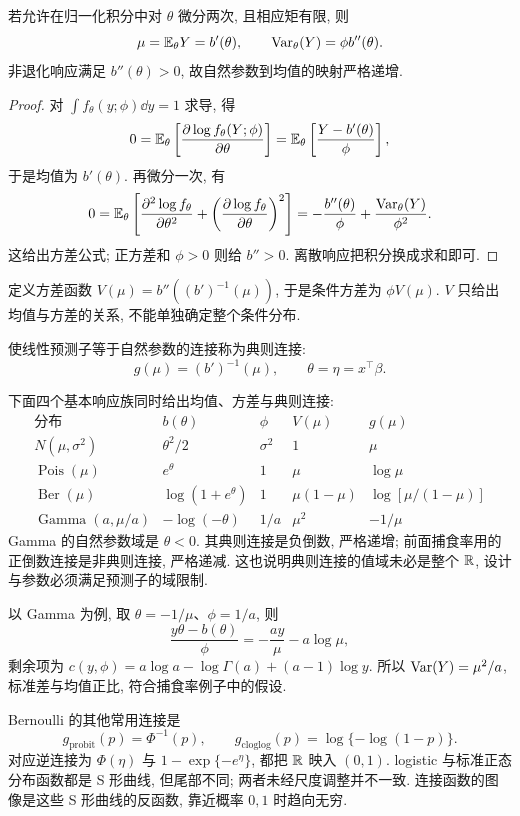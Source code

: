 \begin{theorem}[均值与方差公式]
若允许在归一化积分中对 $\theta$ 微分两次, 且相应矩有限, 则
\[
 \mu=\mathbb E_\theta Y=b'(\theta),\qquad
 \operatorname{Var}_\theta(Y)=\phi b''(\theta).
\]
非退化响应满足 $b''(\theta)>0$, 故自然参数到均值的映射严格递增. 
\end{theorem}
\begin{proof}
对 $\int f_\theta(y;\phi)\dd y=1$ 求导, 得
\[
 0=\mathbb E_\theta\left[\frac{\partial\log f_\theta(Y;\phi)}{\partial\theta}\right]
  =\mathbb E_\theta\left[\frac{Y-b'(\theta)}\phi\right],
\]
于是均值为 $b'(\theta)$. 再微分一次, 有
\[
 0=\mathbb E_\theta\left[\frac{\partial^2\log f_\theta}{\partial\theta^2}
       +\left(\frac{\partial\log f_\theta}{\partial\theta}\right)^2\right]
 =-\frac{b''(\theta)}\phi+\frac{\operatorname{Var}_\theta(Y)}{\phi^2}.
\]
这给出方差公式; 正方差和 $\phi>0$ 则给 $b''>0$. 离散响应把积分换成求和即可. 
\end{proof}
定义方差函数 $V(\mu)=b''((b')^{-1}(\mu))$, 于是条件方差为 $\phi V(\mu)$. $V$ 只给出均值与方差的关系, 不能单独确定整个条件分布. 

\begin{definition}[典则连接]
使线性预测子等于自然参数的连接称为典则连接: 
\[
 g(\mu)=(b')^{-1}(\mu),\qquad\theta=\eta=x^\top\beta.
\]
\end{definition}
下面四个基本响应族同时给出均值、方差与典则连接: 
\[
\begin{array}{c|c|c|c|c}
 \text{分布}&b(\theta)&\phi&V(\mu)&g(\mu)\\ \hline
 N(\mu,\sigma^2)&\theta^2/2&\sigma^2&1&\mu\\
 \operatorname{Pois}(\mu)&e^\theta&1&\mu&\log\mu\\
 \operatorname{Ber}(\mu)&\log(1+e^\theta)&1&\mu(1-\mu)&\log[\mu/(1-\mu)]\\
 \operatorname{Gamma}(a,\mu/a)&-\log(-\theta)&1/a&\mu^2&-1/\mu
\end{array}
\]
Gamma 的自然参数域是 $\theta<0$. 其典则连接是负倒数, 严格递增; 前面捕食率用的正倒数连接是非典则连接, 严格递减. 这也说明典则连接的值域未必是整个 $\mathbb R$, 设计与参数必须满足预测子的域限制. 

以 Gamma 为例, 取 $\theta=-1/\mu$、$\phi=1/a$, 则
\[
 \frac{y\theta-b(\theta)}\phi=-\frac{ay}{\mu}-a\log\mu,
\]
剩余项为 $c(y,\phi)=a\log a-\log\Gamma(a)+(a-1)\log y$. 所以 $\operatorname{Var}(Y)=\mu^2/a$, 标准差与均值正比, 符合捕食率例子中的假设. 

Bernoulli 的其他常用连接是
\[
 g_{\mathrm{probit}}(p)=\Phi^{-1}(p),\qquad
 g_{\mathrm{cloglog}}(p)=\log\{-\log(1-p)\}.
\]
对应逆连接为 $\Phi(\eta)$ 与 $1-\exp\{-e^\eta\}$, 都把 $\mathbb R$ 映入 $(0,1)$. logistic 与标准正态分布函数都是 S 形曲线, 但尾部不同; 两者未经尺度调整并不一致. 连接函数的图像是这些 S 形曲线的反函数, 靠近概率 $0,1$ 时趋向无穷. 

